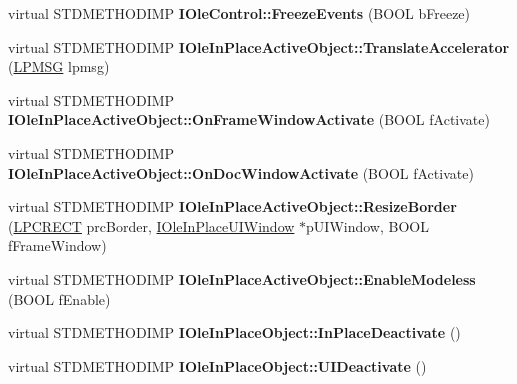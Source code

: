\begin{DoxyCompactItemize}
\item 
\mbox{\label{class_s_e_a_l_e_d___a0ff86109536e0e7a409259bb28b49acb}} 
virtual S\+T\+D\+M\+E\+T\+H\+O\+D\+I\+MP {\bfseries I\+Ole\+Control\+::\+Freeze\+Events} (B\+O\+OL b\+Freeze)
\item 
\mbox{\label{class_s_e_a_l_e_d___a6db972ed7a7ac144b6ed2d8e1439794e}} 
virtual S\+T\+D\+M\+E\+T\+H\+O\+D\+I\+MP {\bfseries I\+Ole\+In\+Place\+Active\+Object\+::\+Translate\+Accelerator} (\hyperlink{structtag_m_s_g}{L\+P\+M\+SG} lpmsg)
\item 
\mbox{\label{class_s_e_a_l_e_d___ac564a12d93c27a3d8ca03ade82158af8}} 
virtual S\+T\+D\+M\+E\+T\+H\+O\+D\+I\+MP {\bfseries I\+Ole\+In\+Place\+Active\+Object\+::\+On\+Frame\+Window\+Activate} (B\+O\+OL f\+Activate)
\item 
\mbox{\label{class_s_e_a_l_e_d___a889af1906df6472d951aea9939fc07e2}} 
virtual S\+T\+D\+M\+E\+T\+H\+O\+D\+I\+MP {\bfseries I\+Ole\+In\+Place\+Active\+Object\+::\+On\+Doc\+Window\+Activate} (B\+O\+OL f\+Activate)
\item 
\mbox{\label{class_s_e_a_l_e_d___a8cf696cf9a068625906c8ea2ed401f6f}} 
virtual S\+T\+D\+M\+E\+T\+H\+O\+D\+I\+MP {\bfseries I\+Ole\+In\+Place\+Active\+Object\+::\+Resize\+Border} (\hyperlink{structtag_r_e_c_t}{L\+P\+C\+R\+E\+CT} prc\+Border, \hyperlink{interface_i_ole_in_place_u_i_window}{I\+Ole\+In\+Place\+U\+I\+Window} $\ast$p\+U\+I\+Window, B\+O\+OL f\+Frame\+Window)
\item 
\mbox{\label{class_s_e_a_l_e_d___a4fceaeccb988c14dbefe3bee82ba8983}} 
virtual S\+T\+D\+M\+E\+T\+H\+O\+D\+I\+MP {\bfseries I\+Ole\+In\+Place\+Active\+Object\+::\+Enable\+Modeless} (B\+O\+OL f\+Enable)
\item 
\mbox{\label{class_s_e_a_l_e_d___a1ea652b9d8cb201fa23b89721dc07e29}} 
virtual S\+T\+D\+M\+E\+T\+H\+O\+D\+I\+MP {\bfseries I\+Ole\+In\+Place\+Object\+::\+In\+Place\+Deactivate} ()
\item 
\mbox{\label{class_s_e_a_l_e_d___aadf3921c4788b460dc1c06eb8d1fb7e5}} 
virtual S\+T\+D\+M\+E\+T\+H\+O\+D\+I\+MP {\bfseries I\+Ole\+In\+Place\+Object\+::\+U\+I\+Deactivate} ()

\end{DoxyCompactItemize}

